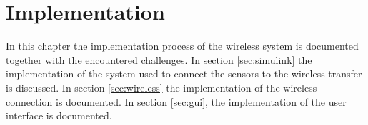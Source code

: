 \chapter{Implementation}
\label{ch:imp}
In this chapter the implementation process of the wireless system is documented together with the encountered challenges. In section \ref{sec:simulink}  the implementation of the system used to connect the sensors to the wireless transfer is discussed. In section \ref{sec:wireless} the implementation of the wireless connection is documented. In section \ref{sec:gui}, the implementation of the user interface is documented.


\pagebreak


\pagebreak